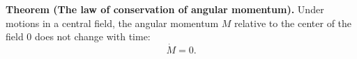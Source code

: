\textbf{Theorem (The law of conservation of angular momentum).} Under motions in a central field, the angular momentum $M$ relative to the center of the field $0$ does not change with time:
$$\dot{M} = 0.$$
